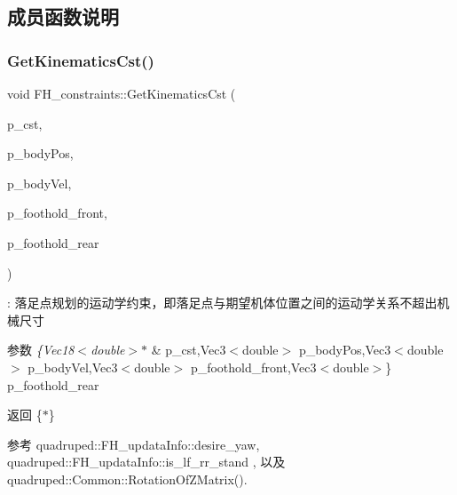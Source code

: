\subsection{成员函数说明}
\mbox{\label{classquadruped_1_1FH__constraints_a9c4c19a1745520d34b10c92883a906e1}} 
\subsubsection{\texorpdfstring{Get\+Kinematics\+Cst()}{GetKinematicsCst()}}
{\footnotesize\ttfamily void F\+H\+\_\+constraints\+::\+Get\+Kinematics\+Cst (\begin{DoxyParamCaption}\item[{\hyperlink{cppTypes_8h_a28d630783cecf8575d068f597c3793f3}{Vec18}$<$ double $>$ $\ast$}]{p\+\_\+cst,  }\item[{\hyperlink{cppTypes_8h_a65c27bf97693676535dd0b30ea0ad399}{Vec3}$<$ double $>$}]{p\+\_\+body\+Pos,  }\item[{\hyperlink{cppTypes_8h_a65c27bf97693676535dd0b30ea0ad399}{Vec3}$<$ double $>$}]{p\+\_\+body\+Vel,  }\item[{\hyperlink{cppTypes_8h_a65c27bf97693676535dd0b30ea0ad399}{Vec3}$<$ double $>$}]{p\+\_\+foothold\+\_\+front,  }\item[{\hyperlink{cppTypes_8h_a65c27bf97693676535dd0b30ea0ad399}{Vec3}$<$ double $>$}]{p\+\_\+foothold\+\_\+rear }\end{DoxyParamCaption})}

\+: 落足点规划的运动学约束，即落足点与期望机体位置之间的运动学关系不超出机械尺寸 
\begin{DoxyParams}{参数}
{\em \{\+Vec18$<$double$>$$\ast$} & p\+\_\+cst,Vec3$<$double$>$ p\+\_\+body\+Pos,Vec3$<$double$>$ p\+\_\+body\+Vel,Vec3$<$double$>$ p\+\_\+foothold\+\_\+front,Vec3$<$double$>$\} p\+\_\+foothold\+\_\+rear \\
\hline
\end{DoxyParams}
\begin{DoxyReturn}{返回}
\{$\ast$\} 
\end{DoxyReturn}


参考 quadruped\+::\+F\+H\+\_\+updata\+Info\+::desire\+\_\+yaw, quadruped\+::\+F\+H\+\_\+updata\+Info\+::is\+\_\+lf\+\_\+rr\+\_\+stand , 以及 quadruped\+::\+Common\+::\+Rotation\+Of\+Z\+Matrix().



